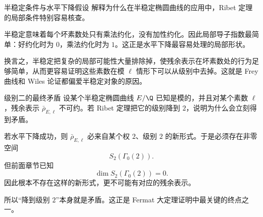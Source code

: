 \begin{problem}{半稳定条件与水平下降假设}
\hard
解释为什么在半稳定椭圆曲线的应用中，Ribet 定理的局部条件特别容易核查。
\end{problem}
\begin{solution}
半稳定意味着每个坏素数处只有乘法约化，没有加性约化。因此局部导子指数最简单：好约化时为 $0$，乘法约化时为 $1$。这正是水平下降最容易处理的局部形状。

换言之，半稳定把复杂的局部可能性大量排除掉，使残余表示在坏素数处的行为足够简单，从而更容易证明这些素数在模 $\ell$ 情形下可以从级别中去掉。这就是 Frey 曲线和 Wiles 论证都偏爱半稳定对象的原因。
\end{solution}

\begin{problem}{级别二的最终矛盾}
\hard
设某个半稳定椭圆曲线 $E/\Q$ 已知是模的，并且对某个素数 $\ell$，残余表示 $\bar\rho_{E,\ell}$ 不可约。若 Ribet 定理把它的级别降到 $2$，说明为什么会立刻得到矛盾。
\end{problem}
\begin{solution}
若水平下降成功，则 $\bar\rho_{E,\ell}$ 必来自某个权 $2$、级别 $2$ 的新形式。于是必须存在非零空间
\[
S_2(\Gamma_0(2)).
\]
但前面章节已知
\[
\dim S_2(\Gamma_0(2))=0.
\]
因此根本不存在这样的新形式，更不可能有对应的残余表示。

所以“降到级别 $2$”本身就是矛盾。这正是 Fermat 大定理证明中最关键的终点之一。
\end{solution}
